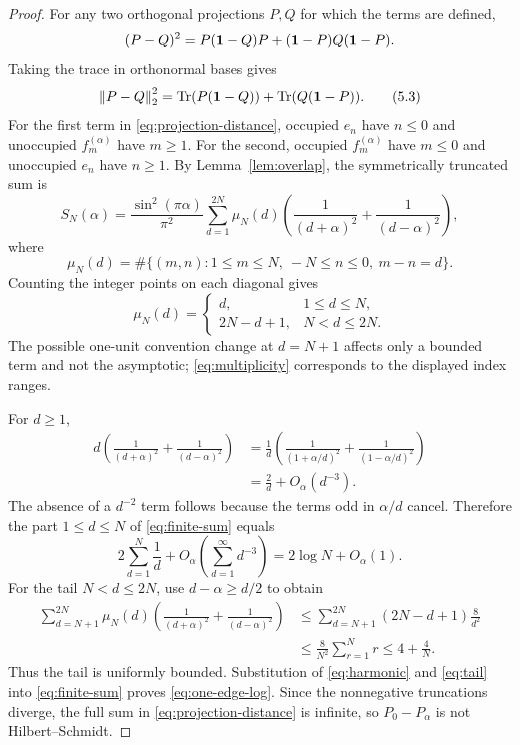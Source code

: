 \begin{proof}
For any two orthogonal projections $P,Q$ for which the terms are
defined,
\[
 (P-Q)^2=P(\mathbf 1-Q)P+(\mathbf 1-P)Q(\mathbf 1-P).
\]
Taking the trace in orthonormal bases gives
\[
 \left\lVert P-Q\right\rVert_2^2
 =\operatorname{Tr}(P(\mathbf 1-Q))+\operatorname{Tr}(Q(\mathbf 1-P)).
\tag{5.3}\label{eq:projection-distance}
\]
For the first term in \eqref{eq:projection-distance}, occupied
$e_n$ have $n\le0$ and unoccupied $f_m^{(\alpha)}$ have $m\ge1$.
For the second, occupied $f_m^{(\alpha)}$ have $m\le0$ and
unoccupied $e_n$ have $n\ge1$.  By Lemma~\ref{lem:overlap}, the
symmetrically truncated sum is
\[
 S_N(\alpha)
 =\frac{\sin^2(\pi\alpha)}{\pi^2}
 \sum_{d=1}^{2N}\mu_N(d)
 \left(\frac1{(d+\alpha)^2}+\frac1{(d-\alpha)^2}\right),
\tag{5.4}\label{eq:finite-sum}
\]
where
\[
 \mu_N(d)=
 \#\{(m,n):1\le m\le N,\ -N\le n\le0,\ m-n=d\}.
\]
Counting the integer points on each diagonal gives
\[
 \mu_N(d)=
 \begin{cases}
 d,&1\le d\le N,\\
 2N-d+1,&N<d\le2N.
 \end{cases}
\tag{5.5}\label{eq:multiplicity}
\]
The possible one-unit convention change at $d=N+1$ affects only a
bounded term and not the asymptotic; \eqref{eq:multiplicity} corresponds
to the displayed index ranges.

For $d\ge1$,
\[
\begin{aligned}
d\left(\frac1{(d+\alpha)^2}+\frac1{(d-\alpha)^2}\right)
&=\frac1d\left(
\frac1{(1+\alpha/d)^2}
+\frac1{(1-\alpha/d)^2}\right)\\
&=\frac2d+O_\alpha(d^{-3}).
\end{aligned}
\tag{5.6}\label{eq:summand-expand}
\]
The absence of a $d^{-2}$ term follows because the terms odd in
$\alpha/d$ cancel.  Therefore the part $1\le d\le N$ of
\eqref{eq:finite-sum} equals
\[
 2\sum_{d=1}^N\frac1d+O_\alpha\left(\sum_{d=1}^\infty d^{-3}\right)
 =2\log N+O_\alpha(1).
\tag{5.7}\label{eq:harmonic}
\]
For the tail $N<d\le2N$, use $d-\alpha\ge d/2$ to obtain
\[
\begin{aligned}
\sum_{d=N+1}^{2N}\mu_N(d)
\left(\frac1{(d+\alpha)^2}+\frac1{(d-\alpha)^2}\right)
&\le
\sum_{d=N+1}^{2N}(2N-d+1)\frac8{d^2}\\
&\le \frac8{N^2}\sum_{r=1}^{N}r
\le 4+\frac4N.
\end{aligned}
\tag{5.8}\label{eq:tail}
\]
Thus the tail is uniformly bounded.  Substitution of
\eqref{eq:harmonic} and \eqref{eq:tail} into \eqref{eq:finite-sum}
proves \eqref{eq:one-edge-log}.  Since the nonnegative truncations
diverge, the full sum in \eqref{eq:projection-distance} is infinite,
so $P_0-P_\alpha$ is not Hilbert--Schmidt.
\end{proof}

